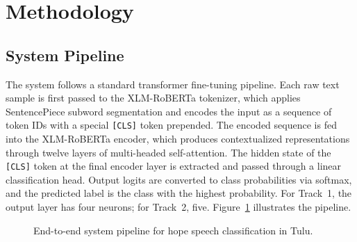 \documentclass[11pt]{article}
\begin{document}
\section{Methodology}

\subsection{System Pipeline}
The system follows a standard transformer fine-tuning pipeline. Each raw text sample
is first passed to the XLM-RoBERTa tokenizer, which applies SentencePiece subword
segmentation and encodes the input as a sequence of token IDs with a special
\texttt{[CLS]} token prepended. The encoded sequence is fed into the XLM-RoBERTa
encoder, which produces contextualized representations through twelve layers of
multi-headed self-attention. The hidden state of the \texttt{[CLS]} token at the
final encoder layer is extracted and passed through a linear classification head.
Output logits are converted to class probabilities via softmax, and the predicted
label is the class with the highest probability. For Track~1, the output layer has
four neurons; for Track~2, five. Figure~\ref{fig:pipeline} illustrates the pipeline.

\begin{figure}[H]
\centering
{}
\caption{End-to-end system pipeline for hope speech classification in Tulu.}
\label{fig:pipeline}
\end{figure}
\end{document}
